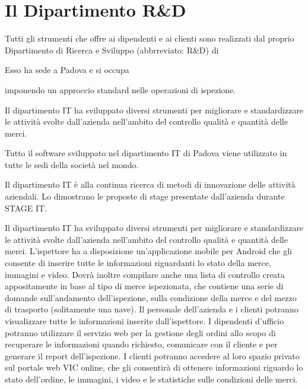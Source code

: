 \section{Il Dipartimento R\&D}
	Tutti gli strumenti che  \vic offre ai dipendenti e ai clienti sono realizzati dal proprio Dipartimento di Ricerca e Sviluppo (abbrreviato: R\&D) di \vic{}
	
	Esso ha sede a Padova e si occupa
	
	
	imponendo un approccio standard nelle operazioni di ispezione.
	
	
	Il dipartimento IT ha sviluppato diversi strumenti per migliorare e standardizzare le
	attività svolte dall’azienda nell’ambito del controllo qualità e quantità delle merci.

		Tutto il software sviluppato nel dipartimento IT di Padova viene utilizzato in tutte le
	sedi della società nel mondo.
	
	Il dipartimento IT è alla continua ricerca di metodi di innovazione delle attività
	aziendali. Lo dimostrano le proposte di stage presentate dall’azienda durante STAGE
	IT. 
	
	
	Il dipartimento IT ha sviluppato diversi strumenti per migliorare e standardizzare le
	attività svolte dall’azienda nell’ambito del controllo qualità e quantità delle merci.
	L’ispettore ha a disposizione un’applicazione mobile per Android che gli consente di
	inserire tutte le informazioni riguardanti lo stato della merce, immagini e video. Dovrà
	inoltre compilare anche una lista di controllo creata appositamente in base al tipo di
	merce ispezionata, che contiene una serie di domande sull’andamento dell’ispezione,
	sulla condizione della merce e del mezzo di trasporto (solitamente una nave).
	Il personale dell’azienda e i clienti potranno visualizzare tutte le informazioni inserite
	dall’ispettore. I dipendenti d’ufficio potranno utilizzare il servizio web per la gestione
	degli ordini allo scopo di recuperare le informazioni quando richiesto, comunicare con il
	cliente e per generare il report dell’ispezione.
	I clienti potranno accedere al loro spazio privato sul portale web VIC online, che gli
	consentirà di ottenere informazioni riguardo lo stato dell’ordine, le immagini, i video e
	le statistiche sulle condizioni delle merci.



